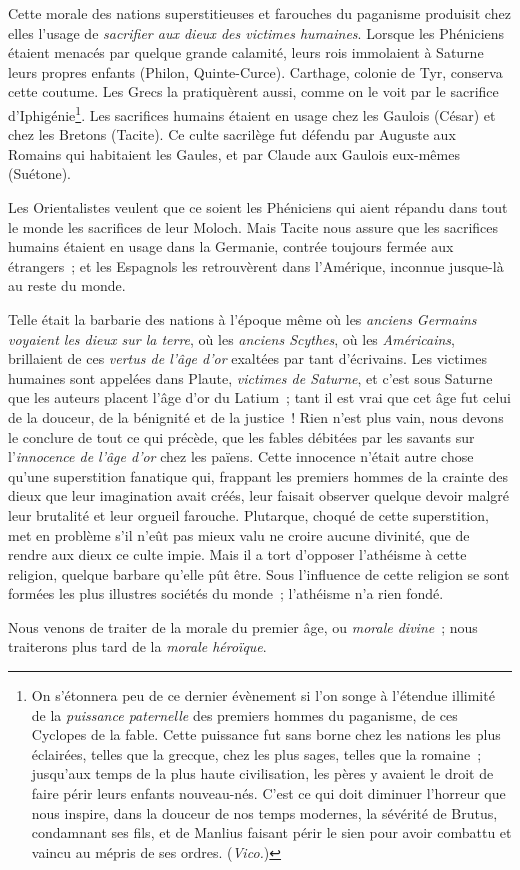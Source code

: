 \documentclass[french,twoside]{book} %
\newcommand\chapterclose{} %
\begin{document}
Cette morale des nations superstitieuses et farouches du paganisme produisit chez elles l’usage de {\itshape sacrifier aux dieux des victimes humaines}. Lorsque les Phéniciens étaient menacés par quelque grande calamité, leurs rois immolaient à Saturne leurs propres enfants (Philon, Quinte-Curce). Carthage, colonie de Tyr, conserva cette coutume. Les Grecs la pratiquèrent aussi, comme on le voit par le sacrifice d’Iphigénie\footnote{On s’étonnera peu de ce dernier évènement si l’on songe à l’étendue illimité de la {\itshape puissance paternelle} des premiers hommes du paganisme, de ces Cyclopes de la fable. Cette puissance fut sans borne chez les nations les plus éclairées, telles que la grecque, chez les plus sages, telles que la romaine ; jusqu’aux temps de la plus haute civilisation, les pères y avaient le droit de faire périr leurs enfants nouveau-nés. C’est ce qui doit diminuer l’horreur que nous inspire, dans la douceur de nos temps modernes, la sévérité de Brutus, condamnant ses fils, et de Manlius faisant périr le sien pour avoir combattu et vaincu au mépris de ses ordres. ({\itshape Vico.})}. Les sacrifices humains étaient en usage  chez les Gaulois (César) et chez les Bretons (Tacite). Ce culte sacrilège fut défendu par Auguste aux Romains qui habitaient les Gaules, et par Claude aux Gaulois eux-mêmes (Suétone).\par
Les Orientalistes veulent que ce soient les Phéniciens qui aient répandu dans tout le monde les sacrifices de leur Moloch. Mais Tacite nous assure que les sacrifices humains étaient en usage dans la Germanie, contrée toujours fermée aux étrangers ; et les Espagnols les retrouvèrent dans l’Amérique, inconnue jusque-là au reste du monde.\par
Telle était la barbarie des nations à l’époque même où les {\itshape anciens Germains voyaient les dieux sur la terre}, où les {\itshape anciens Scythes}, où les {\itshape Américains}, brillaient de ces {\itshape vertus de l’âge d’or} exaltées par tant d’écrivains. Les victimes humaines sont appelées dans Plaute, {\itshape victimes de Saturne}, et c’est sous Saturne que les auteurs placent l’âge d’or du Latium ; tant il est vrai que cet âge fut celui de la douceur, de la bénignité et de la justice ! Rien n’est plus vain, nous devons le conclure de tout ce qui précède, que les fables débitées par les savants sur l’{\itshape innocence de l’âge d’or} chez les païens. Cette innocence n’était autre chose qu’une superstition fanatique qui, frappant les premiers hommes de la crainte des dieux que leur imagination avait créés, leur faisait observer quelque devoir malgré leur brutalité et leur orgueil farouche. Plutarque, choqué de cette superstition, met en problème s’il n’eût pas mieux valu ne croire aucune divinité, que  de rendre aux dieux ce culte impie. Mais il a tort d’opposer l’athéisme à cette religion, quelque barbare qu’elle pût être. Sous l’influence de cette religion se sont formées les plus illustres sociétés du monde ; l’athéisme n’a rien fondé.\par
Nous venons de traiter de la morale du premier âge, ou {\itshape morale divine} ; nous traiterons plus tard de la {\itshape morale héroïque}.
\chapterclose
\end{document}
